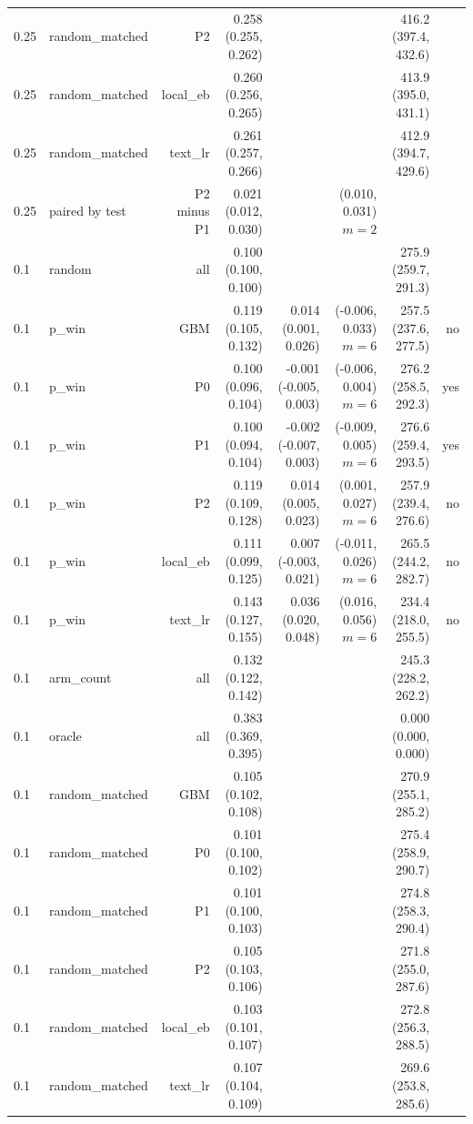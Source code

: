 \begin{tabular}{llrrrrrr}
0.25 & random\_matched & P2 & 0.258 (0.255, 0.262) &  &  & 416.2 (397.4, 432.6) &  \\
0.25 & random\_matched & local\_eb & 0.260 (0.256, 0.265) &  &  & 413.9 (395.0, 431.1) &  \\
0.25 & random\_matched & text\_lr & 0.261 (0.257, 0.266) &  &  & 412.9 (394.7, 429.6) &  \\
0.25 & paired by test & P2 minus P1 & 0.021 (0.012, 0.030) &  & (0.010, 0.031) $m=2$ &  &  \\
0.1 & random & all & 0.100 (0.100, 0.100) &  &  & 275.9 (259.7, 291.3) &  \\
0.1 & p\_win & GBM & 0.119 (0.105, 0.132) & 0.014 (0.001, 0.026) & (-0.006, 0.033) $m=6$ & 257.5 (237.6, 277.5) & no \\
0.1 & p\_win & P0 & 0.100 (0.096, 0.104) & -0.001 (-0.005, 0.003) & (-0.006, 0.004) $m=6$ & 276.2 (258.5, 292.3) & yes \\
0.1 & p\_win & P1 & 0.100 (0.094, 0.104) & -0.002 (-0.007, 0.003) & (-0.009, 0.005) $m=6$ & 276.6 (259.4, 293.5) & yes \\
0.1 & p\_win & P2 & 0.119 (0.109, 0.128) & 0.014 (0.005, 0.023) & (0.001, 0.027) $m=6$ & 257.9 (239.4, 276.6) & no \\
0.1 & p\_win & local\_eb & 0.111 (0.099, 0.125) & 0.007 (-0.003, 0.021) & (-0.011, 0.026) $m=6$ & 265.5 (244.2, 282.7) & no \\
0.1 & p\_win & text\_lr & 0.143 (0.127, 0.155) & 0.036 (0.020, 0.048) & (0.016, 0.056) $m=6$ & 234.4 (218.0, 255.5) & no \\
0.1 & arm\_count & all & 0.132 (0.122, 0.142) &  &  & 245.3 (228.2, 262.2) &  \\
0.1 & oracle & all & 0.383 (0.369, 0.395) &  &  & 0.000 (0.000, 0.000) &  \\
0.1 & random\_matched & GBM & 0.105 (0.102, 0.108) &  &  & 270.9 (255.1, 285.2) &  \\
0.1 & random\_matched & P0 & 0.101 (0.100, 0.102) &  &  & 275.4 (258.9, 290.7) &  \\
0.1 & random\_matched & P1 & 0.101 (0.100, 0.103) &  &  & 274.8 (258.3, 290.4) &  \\
0.1 & random\_matched & P2 & 0.105 (0.103, 0.106) &  &  & 271.8 (255.0, 287.6) &  \\
0.1 & random\_matched & local\_eb & 0.103 (0.101, 0.107) &  &  & 272.8 (256.3, 288.5) &  \\
0.1 & random\_matched & text\_lr & 0.107 (0.104, 0.109) &  &  & 269.6 (253.8, 285.6) &  \\

\end{tabular}
